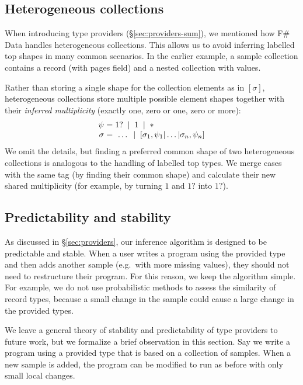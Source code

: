 \documentclass[10pt,nocopyrightspace]{sigplanconf}
\newcommand{\strf}[1]{\textnormal{\textcolor{strclr}{\sffamily #1}}}
\newcommand{\lsep}[0]{\;\; | \;\;}
\newcommand{\narrow}[1]{\hspace{-0.7em} #1 \hspace{-0.7em}}
\begin{document}
\subsection{Heterogeneous collections}
\label{sec:impl-hetero}

When introducing type providers (\S\ref{sec:providers-sum}), we mentioned how F\# Data
handles heterogeneous collections. This allows us to avoid inferring
labelled top shapes in many common scenarios. In the earlier example, a sample collection
contains a record (with \strf{pages} field) and a nested collection with values.

Rather than storing a single shape for the collection elements as in $[\sigma]$, heterogeneous
collections store multiple possible element shapes together with their \emph{  inferred multiplicity}
(exactly one, zero or one, zero or more):
\begin{equation*}
\begin{array}{rcl}
 \psi &\narrow{=}& 1? \lsep 1 \lsep \ast \\
 \sigma &\narrow{=}& ~\ldots \lsep [\sigma_1, \psi_1 | \ldots | \sigma_n, \psi_n ]
\end{array}
\end{equation*}
We omit the details, but finding a preferred common shape of two heterogeneous
collections is analogous to the handling of labelled top types. We merge cases with the same tag (by finding
their common shape) and calculate their new shared multiplicity (for example, by turning
$1$ and $1?$ into $1?$).




\subsection{Predictability and stability}
\label{sec:impl-stable}

As discussed in \S\ref{sec:providers}, our inference algorithm is designed to be predictable
and stable. When a user writes a program using the provided type and then adds another sample
(e.g.~with more missing values), they should not need to restructure their program.
For this reason, we keep the algorithm simple. For example, we do not use probabilistic methods to
assess the similarity of record types, because a small change in the sample could cause a large change
in the provided types.

We leave a general theory of stability and predictability of type providers to future work, but
we formalize a brief observation in this section. Say we write a program using a provided type
that is based on a collection of samples. When a new sample is added, the program can be modified
to run as before with only small local changes.
\end{document}

